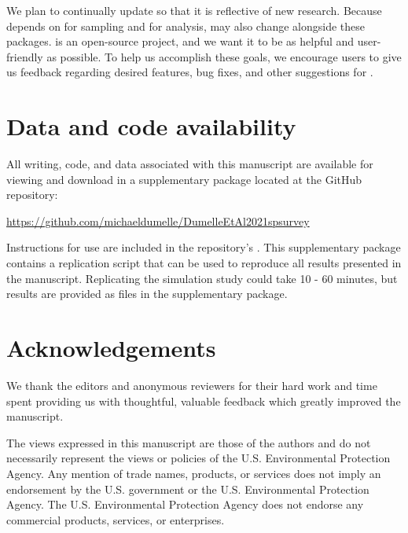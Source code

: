 \documentclass[
  shortnames]{jss}
\begin{document}
We plan to continually update  so that it is reflective of
new research. Because  depends on  for sampling
and  \citep{lumley2020survey} for analysis, 
may also change alongside these packages.  is an
open-source project, and we want it to be as helpful and user-friendly
as possible. To help us accomplish these goals, we encourage users to
give us feedback regarding desired features, bug fixes, and other
suggestions for .

\hypertarget{data-and-code-availability}{%
\section*{Data and code availability}\label{data-and-code-availability}}

All writing, code, and data associated with this manuscript are
available for viewing and download in a supplementary 
package located at the GitHub repository:

\url{https://github.com/michaeldumelle/DumelleEtAl2021spsurvey}

Instructions for use are included in the repository's .
This supplementary  package contains a replication script
that can be used to reproduce all results presented in the manuscript.
Replicating the simulation study could take 10 - 60 minutes, but results
are provided as  files in the supplementary 
package.

\hypertarget{acknowledgements}{%
\section*{Acknowledgements}\label{acknowledgements}}

We thank the editors and anonymous reviewers for their hard work and
time spent providing us with thoughtful, valuable feedback which greatly
improved the manuscript.

The views expressed in this manuscript are those of the authors and do
not necessarily represent the views or policies of the U.S.
Environmental Protection Agency. Any mention of trade names, products,
or services does not imply an endorsement by the U.S. government or the
U.S. Environmental Protection Agency. The U.S. Environmental Protection
Agency does not endorse any commercial products, services, or
enterprises.


\end{document}
